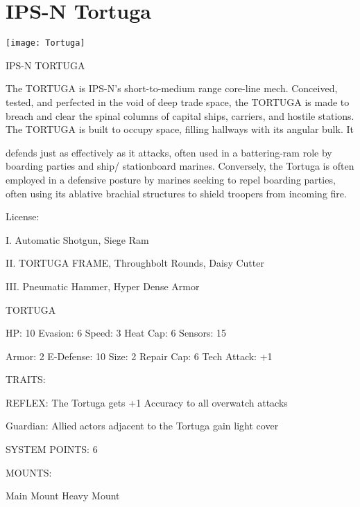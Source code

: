 \section{IPS-N Tortuga}

\texttt{[image: Tortuga]}

                                                   IPS-N TORTUGA

The TORTUGA is IPS-N’s short-to-medium range core-line mech. Conceived, tested, and perfected in the
void of deep trade space, the TORTUGA is made to breach and clear the spinal columns of capital ships,
carriers, and hostile stations. The TORTUGA is built to occupy space, filling hallways with its angular bulk. It




defends just as effectively as it attacks, often used in a battering-ram role by boarding parties and ship/
stationboard marines. Conversely, the Tortuga is often employed in a defensive posture by marines seeking
to repel boarding parties, often using its ablative brachial structures to shield troopers from incoming fire.

                                                   License:

I. Automatic Shotgun, Siege Ram

II. TORTUGA FRAME, Throughbolt Rounds, Daisy Cutter

III. Pneumatic Hammer, Hyper Dense Armor


                                                 TORTUGA

  HP: 10         Evasion: 6                            Speed: 3           Heat Cap: 6        Sensors: 15

  Armor: 2       E-Defense: 10                         Size: 2            Repair Cap: 6      Tech Attack:
                                                                                             +1

                                                   TRAITS:

  REFLEX: The Tortuga gets +1 Accuracy to all overwatch attacks

  Guardian: Allied actors adjacent to the Tortuga gain light cover

                                             SYSTEM POINTS: 6

                                                   MOUNTS:

  Main Mount                        Heavy Mount

